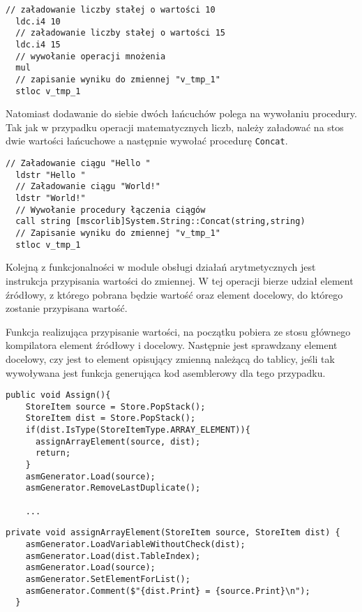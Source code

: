 \begin{lstlisting}[language=IL, caption=Kod assemblera przedstawiający mnożenie dwóch liczb, label=alg:arytm5]
  // załadowanie liczby stałej o wartości 10
  ldc.i4 10
  // załadowanie liczby stałej o wartości 15
  ldc.i4 15
  // wywołanie operacji mnożenia
  mul
  // zapisanie wyniku do zmiennej "v_tmp_1"
  stloc v_tmp_1
\end{lstlisting}
Natomiast dodawanie do siebie dwóch łańcuchów polega na wywołaniu procedury. Tak jak w przypadku operacji matematycznych liczb, należy załadować na stos dwie wartości łańcuchowe a następnie wywołać procedurę \texttt{Concat}.

\begin{lstlisting}[language=IL, caption=Kod assemblera przedstawiający łączenie dwóch tekstów, label=alg:arytm6]
  // Załadowanie ciągu "Hello "
  ldstr "Hello "
  // Załadowanie ciągu "World!"
  ldstr "World!"
  // Wywołanie procedury łączenia ciągów
  call string [mscorlib]System.String::Concat(string,string)
  // Zapisanie wyniku do zmiennej "v_tmp_1"
  stloc v_tmp_1
\end{lstlisting}

\par Kolejną z funkcjonalności w module obsługi działań arytmetycznych jest instrukcja przypisania wartości do zmiennej. W tej operacji bierze udział element źródłowy, z którego pobrana będzie wartość oraz element docelowy, do którego zostanie przypisana wartość.
\par Funkcja realizująca przypisanie wartości, na początku pobiera ze stosu głównego kompilatora element źródłowy i docelowy. Następnie jest sprawdzany element docelowy, czy jest to element opisujący zmienną należącą do tablicy, jeśli tak wywoływana jest funkcja generująca kod asemblerowy dla tego przypadku.

\begin{lstlisting}[language=CSharp, caption=Implementacja funkcji obsługującej przypisanie wartości cz.1, label=alg:assign1]
  public void Assign(){
    StoreItem source = Store.PopStack();
    StoreItem dist = Store.PopStack();
    if(dist.IsType(StoreItemType.ARRAY_ELEMENT)){
      assignArrayElement(source, dist);
      return;
    }
    asmGenerator.Load(source);
    asmGenerator.RemoveLastDuplicate();

    ...
\end{lstlisting}

\begin{lstlisting}[language=CSharp, caption={Implementacja funkcji pomocniczej, obsługującej przypisanie wartości do elementu tablicowego}, label=alg:assign2]
  private void assignArrayElement(StoreItem source, StoreItem dist) {
    asmGenerator.LoadVariableWithoutCheck(dist);
    asmGenerator.Load(dist.TableIndex);
    asmGenerator.Load(source);
    asmGenerator.SetElementForList();
    asmGenerator.Comment($"{dist.Print} = {source.Print}\n");
  }
\end{lstlisting}

